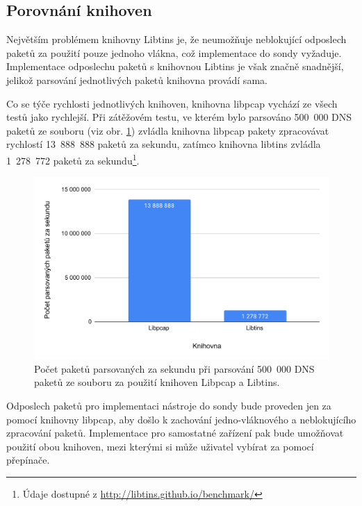 \subsection{Porovnání knihoven}
Největším problémem knihovny Libtins je, že neumožňuje neblokující odposlech paketů za použití pouze jednoho vlákna, což implementace do sondy vyžaduje. Implementace odposlechu paketů s knihovnou Libtins je však značně snadnější, jelikož parsování jednotlivých paketů knihovna provádí sama.

Co se týče rychlosti jednotlivých knihoven, knihovna libpcap vychází ze všech testů jako rychlejší. Při zátěžovém testu, ve kterém bylo parsováno 500~000 DNS paketů ze souboru (viz obr. \ref{img:knihovny}) zvládla knihovna libpcap pakety zpracovávat rychlostí 13~888~888 paketů za sekundu, zatímco knihovna libtins zvládla 1~278~772 paketů za sekundu\footnote{Údaje dostupné z \url{http://libtins.github.io/benchmark/}}.
\begin{figure}[htbp]
  \centering
  \includegraphics[width=15cm]{obrazky-figures/knihovny.pdf}
  \caption{Počet paketů parsovaných za sekundu při parsování 500~000 DNS paketů ze souboru za použití knihoven Libpcap a Libtins.}
  \label{img:knihovny} 
\end{figure}

Odposlech paketů pro implementaci nástroje do sondy bude proveden jen za pomocí knihovny libpcap, aby došlo k zachování jedno-vláknového a neblokujícího zpracování paketů. Implementace pro samostatné zařízení pak bude umožňovat použití obou knihoven, mezi kterými si může uživatel vybírat za pomocí přepínače.

